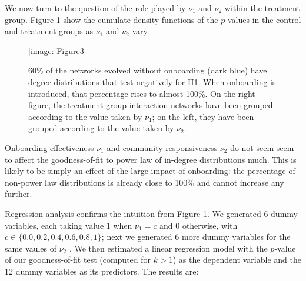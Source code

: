 \documentclass{bmcart}
\def\texttt{[image: ]}
\begin{document}
We now turn to the question of the role played by $\nu_1$ and $\nu_2$ within the treatment group. Figure \ref{fig:CDFpvcnu_1nu_2} show the cumulate density functions of the $p$-values in the control and treatment groups as $\nu_1$ and $\nu_2$ vary. 

\begin{figure}[thb]
\texttt{[image: Figure3]}
\caption{
60\% of the networks evolved without onboarding (dark blue) have degree distributions that test negatively for H1. When onboarding is introduced, that percentage rises to almost 100\%. On the right figure, the treatment group interaction networks have been grouped according to the value taken by $\nu_1$; on the left, they have been grouped according to the value taken by $\nu_2$.}
\label{fig:CDFpvcnu_1nu_2}
\end{figure}

%

Onboarding effectiveness $\nu_1$ and community responsiveness $\nu_2$ do not seem seem to affect the goodness-of-fit to power law of in-degree distributions much. This is likely to be simply an effect of the large impact of onboarding: the percentage of non-power law distributions is already close to 100\% and cannot increase any further.

Regression analysis confirms the intuition from Figure \ref{fig:CDFpvcnu_1nu_2}. We generated 6 dummy variables, each taking value 1 when $\nu_1 =  c$ and 0 otherwise, with $c \in \{0.0, 0.2, 0.4, 0.6, 0.8, 1\}$; next we generated 6 more dummy variables for the same vaules of $\nu_2$ . We then estimated a linear regression model with the $p$-value of our goodness-of-fit test (computed for $k >1$) as the dependent variable and the 12 dummy variables as its predictors. The results are:
\end{document}

